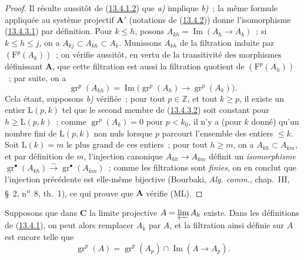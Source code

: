 \begin{proof}
Il résulte aussitôt de
(\hyperref[0.13.4.1.2-fr]{13.4.1.2}) que \emph{a)} implique \emph{b)}~; la
même formule appliquée au système projectif $\mathbf A'$ (notations de
(\hyperref[0.13.4.2-fr]{13.4.2})) donne l'isomorphisme
(\hyperref[0.13.4.3.1-fr]{13.4.3.1}) par définition. Pour $k\leq h$,
posons $A_{kh}=\operatorname{Im}(A_h\to A_k)$~; si $k\leq h\leq j$, on a
$A_{kj}\subset A_{kh}\subset A_k$. Munissons $A_{kh}$ de la filtration
induite par $(\mathrm F^p(A_k))$~; on vérifie aussitôt, en vertu de la
transitivité des morphismes définissant $\mathbf A$, que cette filtration
est aussi la filtration quotient de $(\mathrm F^p(A_h))$~; par suite, on a
\begin{equation}
\label{0.13.4.3.2-fr}
\tag{13.4.3.2}
\operatorname{gr}^p(A_{kh})=
\operatorname{Im}\bigl(\operatorname{gr}^p(A_h)\longrightarrow
\operatorname{gr}^p(A_k)\bigr).
\end{equation}
Cela étant, supposons \emph{b)} vérifiée~; pour tout $p\in\mathbb Z$, et
tout $k\geq p$, il existe un entier $\mathrm L(p,k)$ tel que le second
membre de (\hyperref[0.13.4.3.2-fr]{13.4.3.2}) soit constant pour
$h\geq\mathrm L(p,k)$~; comme $\operatorname{gr}^p(A_k)=0$ pour $p<k_0$,
il n'y a (pour $k$ donné) qu'un nombre fini de $\mathrm L(p,k)$ non nuls
lorsque $p$ parcourt l'ensemble des entiers $\leq k$. Soit
$\mathrm L(k)=m$ le plus grand de ces entiers~; pour tout $h\geq m$, on a
$A_{kh}\subset A_{km}$, et par définition de $m$, l'injection canonique
$A_{kh}\to A_{km}$ définit un \emph{isomorphisme}
$\operatorname{gr}^\bullet(A_{kh})\xrightarrow{\sim}
\operatorname{gr}^\bullet(A_{km})$~; comme les filtrations sont
\emph{finies}, on en conclut que l'injection précédente est elle-même
bijective (Bourbaki, \emph{Alg. comm.}, chap.~III, §~2,
n\textsuperscript{o}~8, th.~1), ce qui prouve que $\mathbf A$ vérifie
(ML).
\end{proof}

\begin{env}[13.4.4]
\label{0.13.4.4-fr}
Supposons que dans $\boldsymbol{C}$ la limite projective
$A=\varprojlim A_k$ existe. Dans les définitions de
(\hyperref[0.13.4.1-fr]{13.4.1}), on peut alors remplacer $A_k$ par $A$,
et la filtration ainsi définie sur $A$ est encore telle que
\begin{equation}
\label{0.13.4.4.1-fr}
\tag{13.4.4.1}
\operatorname{gr}^p(A)=\operatorname{gr}^p(A_p)
\cap\operatorname{Im}(A\longrightarrow A_p).
\end{equation}
\end{env}

